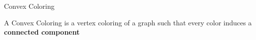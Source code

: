 \begin{frame}{Convex Coloring}

\begin{definition}
A \alert{Convex Coloring} 
is a vertex coloring of a graph such that every color induces a \textbf{connected component}
\end{definition}

\pause

\end{frame}
